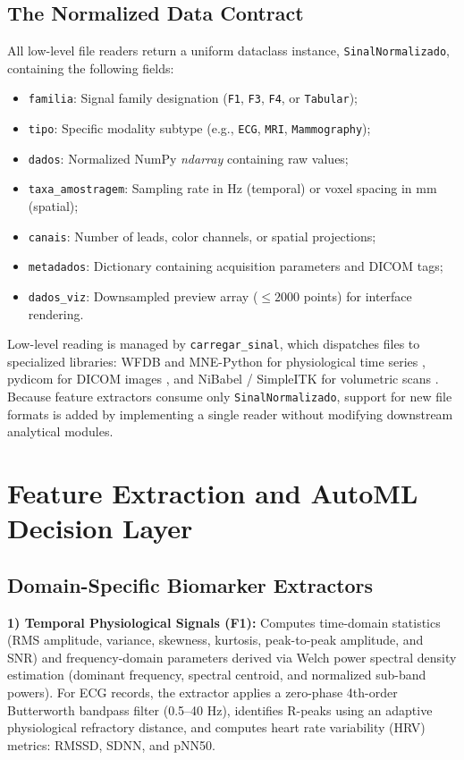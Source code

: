 \documentclass[conference]{IEEEtran}
\begin{document}
\subsection{The Normalized Data Contract}
All low-level file readers return a uniform dataclass instance, \texttt{SinalNormalizado}, containing the following fields:
\begin{itemize}
    \item \texttt{familia}: Signal family designation (\texttt{F1}, \texttt{F3}, \texttt{F4}, or \texttt{Tabular});
    \item \texttt{tipo}: Specific modality subtype (e.g., \texttt{ECG}, \texttt{MRI}, \texttt{Mammography});
    \item \texttt{dados}: Normalized NumPy \textit{ndarray} containing raw values;
    \item \texttt{taxa\_amostragem}: Sampling rate in Hz (temporal) or voxel spacing in mm (spatial);
    \item \texttt{canais}: Number of leads, color channels, or spatial projections;
    \item \texttt{metadados}: Dictionary containing acquisition parameters and DICOM tags;
    \item \texttt{dados\_viz}: Downsampled preview array ($\le 2000$ points) for interface rendering.
\end{itemize}
Low-level reading is managed by \texttt{carregar\_sinal}, which dispatches files to specialized libraries: WFDB and MNE-Python for physiological time series \cite{gramfort2013}, pydicom for DICOM images \cite{mason2011pydicom}, and NiBabel / SimpleITK for volumetric scans \cite{brett2020nibabel}. Because feature extractors consume only \texttt{SinalNormalizado}, support for new file formats is added by implementing a single reader without modifying downstream analytical modules.

\section{Feature Extraction and AutoML Decision Layer}

\subsection{Domain-Specific Biomarker Extractors}
\textbf{1) Temporal Physiological Signals (F1):} Computes time-domain statistics (RMS amplitude, variance, skewness, kurtosis, peak-to-peak amplitude, and SNR) and frequency-domain parameters derived via Welch power spectral density estimation (dominant frequency, spectral centroid, and normalized sub-band powers). For ECG records, the extractor applies a zero-phase 4th-order Butterworth bandpass filter (0.5--40 Hz), identifies R-peaks using an adaptive physiological refractory distance, and computes heart rate variability (HRV) metrics: RMSSD, SDNN, and pNN50.
\end{document}
